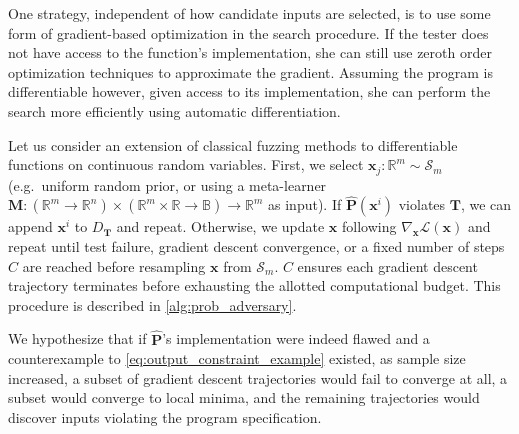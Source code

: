 \documentclass[12pt,initial,twoside,maitrise]{dms}
\numberwithin{equation}{section}
\numberwithin{table}{chapter}
\numberwithin{figure}{chapter}
\begin{document}
One strategy, independent of how candidate inputs are selected, is to use some form of gradient-based optimization in the search procedure. If the tester does not have access to the function's implementation, she can still use zeroth order optimization techniques to approximate the gradient. Assuming the program is differentiable however, given access to its implementation, she can perform the search more efficiently using automatic differentiation.
%

%
%

Let us consider an extension of classical fuzzing methods to differentiable functions on continuous random variables. First, we select $\mathbf{x}_j: \mathbb{R}^m \sim \mathcal S_m$ (e.g.\ uniform random prior, or using a meta-learner $\mathbf M: (\mathbb{R}^m \rightarrow \mathbb{R}^n) \times (\mathbb{R}^m \times \mathbb R \rightarrow \mathbb B) \rightarrow \mathbb{R}^m$ as input). If $\mathbf{\hat P}(\mathbf{x}^i)$ violates $\mathbf T$, we can append $\mathbf x^i$ to $D_\mathbf T$ and repeat. Otherwise, we update $\mathbf x$ following $\nabla_{\mathbf x}\mathcal{L}(\mathbf{x})$ and repeat until test failure, gradient descent convergence, or a fixed number of steps $C$ are reached before resampling $\mathbf{x}$ from $\mathcal S_m$. $C$ ensures each gradient descent trajectory terminates before exhausting the allotted computational budget. This procedure is described in \autoref{alg:prob_adversary}.

We hypothesize that if $\mathbf{\hat P}$'s implementation were indeed flawed and a counterexample to \autoref{eq:output_constraint_example} existed, as sample size increased, a subset of gradient descent trajectories would fail to converge at all, a subset would converge to local minima, and the remaining trajectories would discover inputs violating the program specification.
\end{document}
